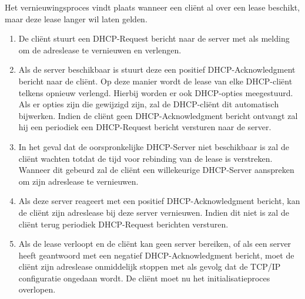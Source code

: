 \documentclass{report}
\begin{document}
\begin{enumerate}
{\begin{enumerate}
	\end{enumerate}
	
	Het vernieuwingsproces vindt plaats wanneer een cliënt al over een lease beschikt, maar deze lease langer wil laten gelden.
	\begin{enumerate}
	\item De cliënt stuurt een DHCP-Request bericht naar de server met als melding om de adreslease te vernieuwen en verlengen.
	\item Als de server beschikbaar is stuurt deze een positief DHCP-Acknowledgment bericht naar de cliënt. Op deze manier wordt de lease van elke DHCP-cliënt telkens opnieuw verlengd. Hierbij worden er ook DHCP-opties meegestuurd. Als er opties zijn die gewijzigd zijn, zal de DHCP-cliënt dit automatisch bijwerken. Indien de cliënt geen DHCP-Acknowledgment bericht ontvangt zal hij een periodiek een DHCP-Request bericht versturen naar de server.
	\item In het geval dat de oorspronkelijke DHCP-Server niet beschikbaar is zal de cliënt wachten totdat de tijd voor rebinding van de lease is verstreken. Wanneer dit gebeurd zal de cliënt een willekeurige DHCP-Server aanspreken om zijn adreslease te vernieuwen.
	\item Als deze server reageert met een positief DHCP-Acknowledgment bericht, kan de cliënt zijn adreslease bij deze server vernieuwen. Indien dit niet is zal de cliënt terug periodiek DHCP-Request berichten versturen.
	\item Als de lease verloopt en de cliënt kan geen server bereiken, of als een server heeft geantwoord met een negatief DHCP-Acknowledgment bericht, moet de cliënt zijn adreslease onmiddelijk stoppen met als gevolg dat de TCP/IP configuratie ongedaan wordt. De cliënt moet nu het initialisatieproces overlopen.
	\end{enumerate}
}


\end{enumerate}
\end{document}

